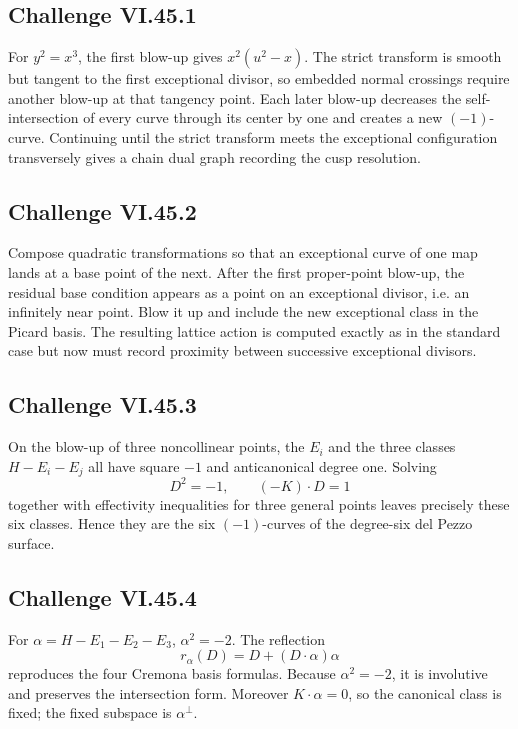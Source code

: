 \subsection*{Challenge VI.45.1}
\begin{solution}
For \(y^2=x^3\), the first blow-up gives \(x^2(u^2-x)\).  The strict transform is smooth but tangent to the first exceptional divisor, so embedded normal crossings require another blow-up at that tangency point.  Each later blow-up decreases the self-intersection of every curve through its center by one and creates a new \((-1)\)-curve.  Continuing until the strict transform meets the exceptional configuration transversely gives a chain dual graph recording the cusp resolution.
\end{solution}

\subsection*{Challenge VI.45.2}
\begin{solution}
Compose quadratic transformations so that an exceptional curve of one map lands at a base point of the next.  After the first proper-point blow-up, the residual base condition appears as a point on an exceptional divisor, i.e. an infinitely near point.  Blow it up and include the new exceptional class in the Picard basis.  The resulting lattice action is computed exactly as in the standard case but now must record proximity between successive exceptional divisors.
\end{solution}

\subsection*{Challenge VI.45.3}
\begin{solution}
On the blow-up of three noncollinear points, the \(E_i\) and the three classes \(H-E_i-E_j\) all have square \(-1\) and anticanonical degree one.  Solving
\[
D^2=-1,\qquad (-K)\cdot D=1
\]
together with effectivity inequalities for three general points leaves precisely these six classes.  Hence they are the six \((-1)\)-curves of the degree-six del Pezzo surface.
\end{solution}

\subsection*{Challenge VI.45.4}
\begin{solution}
For \(\alpha=H-E_1-E_2-E_3\), \(\alpha^2=-2\).  The reflection
\[
r_\alpha(D)=D+(D\cdot\alpha)\alpha
\]
reproduces the four Cremona basis formulas.  Because \(\alpha^2=-2\), it is involutive and preserves the intersection form.  Moreover \(K\cdot\alpha=0\), so the canonical class is fixed; the fixed subspace is \(\alpha^\perp\).
\end{solution}

